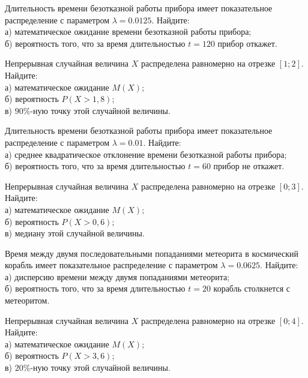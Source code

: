 \vfill

\z Длительность времени безотказной работы прибора имеет показательное распределение с параметром $\lambda = 0.0125$. Найдите: \\ \quad а) математическое ожидание времени безотказной работы прибора; \\ \quad б) вероятность того, что за время длительностью $t = 120$ прибор  откажет.
 

\vfill

\newpage\setcounter{zad}{0}

\z Непрерывная случайная величина $X$ распределена равномерно на отрезке $[1; 2]$. Найдите: \\ \quad а) математическое ожидание $M(X)$; \\ \quad б) вероятность $P(X>1{,}8)$; \\ \quad в) $90\%$-ную точку этой случайной величины.


\vfill

\z Длительность времени безотказной работы прибора имеет показательное распределение с параметром $\lambda = 0.01$. Найдите: \\ \quad а) среднее квадратическое отклонение времени безотказной работы прибора; \\ \quad б) вероятность того, что за время длительностью $t = 60$ прибор не откажет.
 

\vfill

\newpage\setcounter{zad}{0}

\z Непрерывная случайная величина $X$ распределена равномерно на отрезке $[0; 3]$. Найдите: \\ \quad а) математическое ожидание $M(X)$; \\ \quad б) вероятность $P(X>0{,}6)$; \\ \quad в) медиану этой случайной величины.


\vfill

\z Время между двумя последовательными попаданиями метеорита в космический корабль имеет показательное распределение с параметром $\lambda = 0.0625$. Найдите: \\ \quad а) дисперсию времени между двумя попаданиями метеорита; \\ \quad б) вероятность того, что за время длительностью $t = 20$ корабль  столкнется с метеоритом.
 

\vfill

\newpage\setcounter{zad}{0}

\z Непрерывная случайная величина $X$ распределена равномерно на отрезке $[0; 4]$. Найдите: \\ \quad а) математическое ожидание $M(X)$; \\ \quad б) вероятность $P(X>3{,}6)$; \\ \quad в) $20\%$-ную точку этой случайной величины.


